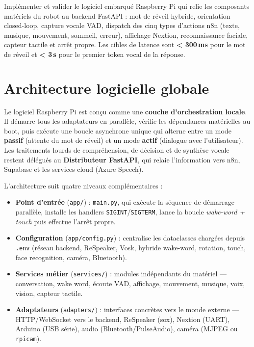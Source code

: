 \documentclass[a4paper,12pt]{report}
\begin{document}
	\begin{tcolorbox}[colback=blue!5!white, colframe=blue!60!black,
		title=\textbf{Objectif du Cycle 4}]
		Implémenter et valider le logiciel embarqué Raspberry Pi qui relie les
		composants matériels du robot au backend FastAPI : mot de réveil hybride,
		orientation closed-loop, capture vocale VAD, dispatch des cinq types
		d'actions n8n (texte, musique, mouvement, sommeil, erreur), affichage
		Nextion, reconnaissance faciale, capteur tactile et arrêt propre. Les
		cibles de latence sont \textbf{< 300\,ms} pour le mot de réveil et
		\textbf{< 3\,s} pour le premier token vocal de la réponse.
	\end{tcolorbox}
	
	\section{Architecture logicielle globale}
	
	Le logiciel Raspberry Pi est conçu comme une \textbf{couche d'orchestration
	locale}. Il démarre tous les adaptateurs en parallèle, vérifie les
	dépendances matérielles au boot, puis exécute une boucle asynchrone unique
	qui alterne entre un mode \textbf{passif} (attente du mot de réveil) et un
	mode \textbf{actif} (dialogue avec l'utilisateur). Les traitements lourds de
	compréhension, de décision et de synthèse vocale restent délégués au
	\textbf{Distributeur FastAPI}, qui relaie l'information vers n8n, Supabase et
	les services cloud (Azure Speech).
	
	L'architecture suit quatre niveaux complémentaires :
	\begin{itemize}
		\item \textbf{Point d'entrée} (\texttt{app/}) : \texttt{main.py}, qui
		exécute la séquence de démarrage parallèle, installe les handlers
		\texttt{SIGINT}/\texttt{SIGTERM}, lance la boucle \emph{wake-word + touch}
		puis effectue l'arrêt propre.
		\item \textbf{Configuration} (\texttt{app/config.py}) : centralise les
		dataclasses chargées depuis \texttt{.env} (réseau backend, ReSpeaker,
		Vosk, hybride wake-word, rotation, touch, face recognition, caméra,
		Bluetooth).
		\item \textbf{Services métier} (\texttt{services/}) : modules
		indépendants du matériel — conversation, wake word, écoute VAD,
		affichage, mouvement, musique, voix, vision, capteur tactile.
		\item \textbf{Adaptateurs} (\texttt{adapters/}) : interfaces concrètes
		vers le monde externe — HTTP/WebSocket vers le backend, ReSpeaker (sox),
		Nextion (UART), Arduino (USB série), audio (Bluetooth/PulseAudio),
		caméra (MJPEG ou \texttt{rpicam}).
	\end{itemize}
	
\end{document}
